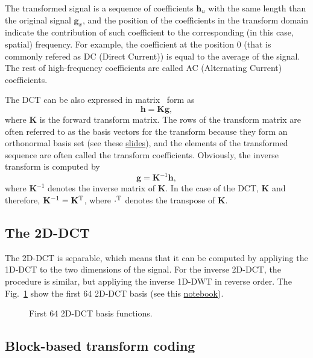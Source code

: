 The transformed signal is a sequence of coefficients ${\mathbf h}_u$
with the same length than the original signal ${\mathbf g}_x$, and the
position of the coefficients in the transform domain indicate the
contribution of such coefficient to the corresponding (in this case,
spatial) frequency. For example, the coefficient at the position 0
(that is commonly refered as DC (Direct Current)) is equal to the
average of the signal. The rest of high-frequency coefficients are
called AC (Alternating Current) coefficients.

The DCT can be also expressed in matrix~\cite{sayood2017introduction}
form as
\begin{equation}
  {\mathbf h} = {\mathbf K}{\mathbf g},
\end{equation}
where ${\mathbf K}$ is the forward transform matrix. The rows of the
transform matrix are often referred to as the basis vectors for the
transform because they form an orthonormal basis set (see these
\href{https://cseweb.ucsd.edu/classes/fa17/cse166-a/lec13.pdf}{slides}),
and the elements of the transformed sequence are often called the
transform coefficients. Obviously, the inverse transform is computed
by
\begin{equation}
  {\mathbf g} = {\mathbf K}^{-1}{\mathbf h},
\end{equation}
where ${\mathbf K}^{-1}$ denotes the inverse matrix of ${\mathbf
  K}$. In the case of the DCT, ${\mathbf K}$ and therefore, ${\mathbf
  K}^{-1}={\mathbf K}^{\text T}$, where $\cdot^{\text T}$ denotes the
transpose of ${\mathbf K}$.

\subsection{The 2D-DCT}

The 2D-DCT is separable, which means that it can be computed by
appliying the 1D-DCT to the two dimensions of the signal. For the
inverse 2D-DCT, the procedure is similar, but appliying the inverse
1D-DWT in reverse order. The Fig.~\ref{fig:2D-DCT_basis} show the
first 64 2D-DCT basis (see this
\href{https://github.com/Sistemas-Multimedia/Sistemas-Multimedia.github.io/blob/master/milestones/07-DCT/DCT_basis.ipynb}{notebook}).

\begin{figure}
  \centering
  \caption{First 64 2D-DCT basis functions.}
  \label{fig:2D-DCT_basis}
\end{figure}

\subsection{Block-based transform coding}

